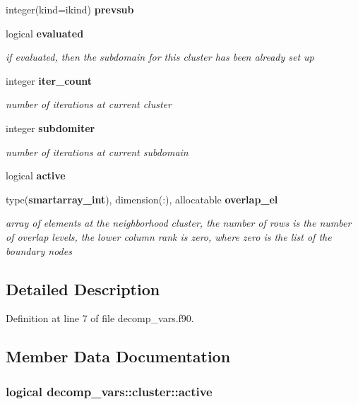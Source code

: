 \begin{DoxyCompactItemize}
integer(kind=ikind) {\bf prevsub}
\item 
logical {\bf evaluated}
\begin{DoxyCompactList}\small\item\em if evaluated, then the subdomain for this cluster has been already set up \end{DoxyCompactList}\item 
integer {\bf iter\+\_\+count}
\begin{DoxyCompactList}\small\item\em number of iterations at current cluster \end{DoxyCompactList}\item 
integer {\bf subdomiter}
\begin{DoxyCompactList}\small\item\em number of iterations at current subdomain \end{DoxyCompactList}\item 
logical {\bf active}
\item 
type({\bf smartarray\+\_\+int}), dimension(\+:), allocatable {\bf overlap\+\_\+el}
\begin{DoxyCompactList}\small\item\em array of elements at the neighborhood cluster, the number of rows is the number of overlap levels, the lower column rank is zero, where zero is the list of the boundary nodes \end{DoxyCompactList}\end{DoxyCompactItemize}


\subsection{Detailed Description}


Definition at line 7 of file decomp\+\_\+vars.\+f90.



\subsection{Member Data Documentation}
\subsubsection[{active}]{\setlength{\rightskip}{0pt plus 5cm}logical decomp\+\_\+vars\+::cluster\+::active\hspace{0.3cm}{\ttfamily [private]}}\label{structdecomp__vars_1_1cluster_aa4e7ecbf3a6514d511a1d7f3f4362bfe}


